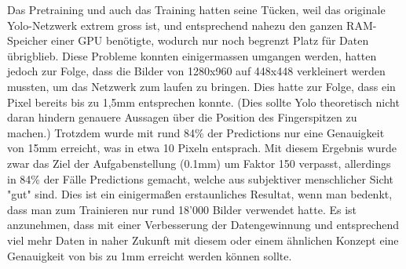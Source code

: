 Das Pretraining und auch das Training hatten seine Tücken, weil das originale Yolo-Netzwerk extrem gross ist, und entsprechend nahezu den ganzen RAM-Speicher einer GPU benötigte, wodurch nur noch begrenzt Platz für Daten übrigblieb. 
Diese Probleme konnten einigermassen umgangen werden, hatten jedoch zur Folge, dass die Bilder von 1280x960 auf 448x448 verkleinert werden mussten, um das Netzwerk zum laufen zu bringen. 
Dies hatte zur Folge, dass ein Pixel bereits bis zu 1,5mm entsprechen konnte. (Dies sollte Yolo theoretisch nicht daran hindern genauere Aussagen über die Position des Fingerspitzen zu machen.) 
Trotzdem wurde mit rund 84\% der Predictions nur eine Genauigkeit von 15mm erreicht, was in etwa 10 Pixeln entsprach. 
Mit diesem Ergebnis wurde zwar das Ziel der Aufgabenstellung (0.1mm) um Faktor 150 verpasst, allerdings in 84\% der Fälle Predictions gemacht, welche aus subjektiver menschlicher Sicht "gut" sind. 
Dies ist ein einigermaßen erstaunliches Resultat, wenn man bedenkt, dass man zum Trainieren nur rund 18'000 Bilder verwendet hatte. 
Es ist anzunehmen, dass mit einer Verbesserung der Datengewinnung und entsprechend viel mehr Daten in naher Zukunft mit diesem oder einem ähnlichen Konzept eine Genauigkeit von bis zu 1mm erreicht werden können sollte.
